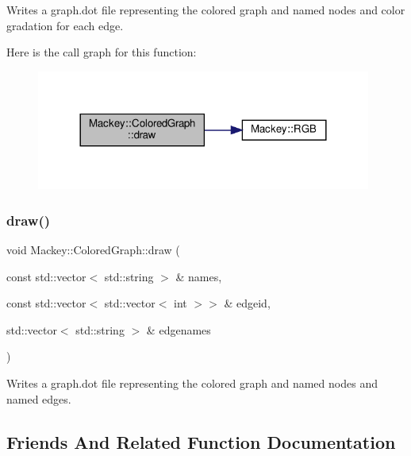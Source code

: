 Writes a graph.\+dot file representing the colored graph and named nodes and color gradation for each edge. 

Here is the call graph for this function\+:\nopagebreak
\begin{figure}[H]
\begin{center}
\leavevmode
\includegraphics[width=312pt]{classMackey_1_1ColoredGraph_a5368f26080615293e8c43657f61f9100_cgraph}
\end{center}
\end{figure}
\mbox{\label{classMackey_1_1ColoredGraph_a88cde9e3cc3bfb72409142ac6705b474}} 
\subsubsection{\texorpdfstring{draw()}{draw()}\hspace{0.1cm}{\footnotesize\ttfamily [4/4]}}
{\footnotesize\ttfamily void Mackey\+::\+Colored\+Graph\+::draw (\begin{DoxyParamCaption}\item[{const std\+::vector$<$ std\+::string $>$ \&}]{names,  }\item[{const std\+::vector$<$ std\+::vector$<$ int $>$$>$ \&}]{edgeid,  }\item[{std\+::vector$<$ std\+::string $>$ \&}]{edgenames }\end{DoxyParamCaption})}



Writes a graph.\+dot file representing the colored graph and named nodes and named edges. 



\subsection{Friends And Related Function Documentation}
\mbox{\label{classMackey_1_1ColoredGraph_a2debfc8158c19d7b93550156a3e2676a}} 
